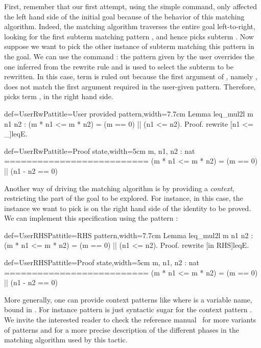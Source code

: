 First, remember that our first attempt, using the simple
 command, only
affected the left hand side of the initial goal because of the
behavior of this matching algorithm.
Indeed, the matching algorithm traverses the entire goal
left-to-right, looking for the first subterm matching pattern
\C{(_ <= _)},  and hence picks subterm .
Now suppose we want to pick
the other instance of subterm matching this pattern in the goal. We
can use the command : the
pattern given by the user overrides the one inferred from the rewrite
rule and is used to select the subterm to be rewritten. In this case,
term  is ruled out because the first argument of
\C{<=}, namely , does not match the first argument 
required in the user-given pattern. Therefore,  picks term
, in the right hand side.

\begin{coq}{def=UserRwPat}{title=User provided pattern,width=7.7cm}
Lemma leq_mul2l m n1 n2 :
(m * n1 <= m * n2) = (m == 0) || (n1 <= n2).
Proof.
rewrite [n1 <= _]leqE.
\end{coq}
\begin{coqout}{def=UserRwPat}{title=Proof state,width=5cm}
m, n1, n2 : nat
==========================
(m * n1 <= m * n2) =
(m == 0) || (n1 - n2 == 0)
\end{coqout}

Another way of driving the matching algorithm is by providing a
\emph{context}, restricting the part of the goal to be explored. For
instance, in this case, the instance we want to pick is on
the right hand side of the identity to be proved. We can implement
this specification using the pattern \C{[in RHS]}:

\begin{coq}{def=UserRHSPat}{title=RHS pattern,width=7.7cm}
Lemma leq_mul2l m n1 n2 :
(m * n1 <= m * n2) = (m == 0) || (n1 <= n2).
Proof.
rewrite [in RHS]leqE.
\end{coq}
\begin{coqout}{def=UserRHSPat}{title=Proof state,width=5cm}
m, n1, n2 : nat
==========================
(m * n1 <= m * n2) =
(m == 0) || (n1 - n2 == 0)
\end{coqout}

More generally, one can provide context patterns like \C{[in X in T]}
where  is a variable name, bound in . For instance pattern
\C{[in RHS]} is just syntactic sugar for the context pattern
\C{[in X in _ = X]}.  We invite the interested reader to check the
reference manual~\cite[section 8]{ssrman} for more variants of patterns and for a
more precise description of the different phases in the matching
algorithm used by this tactic.

